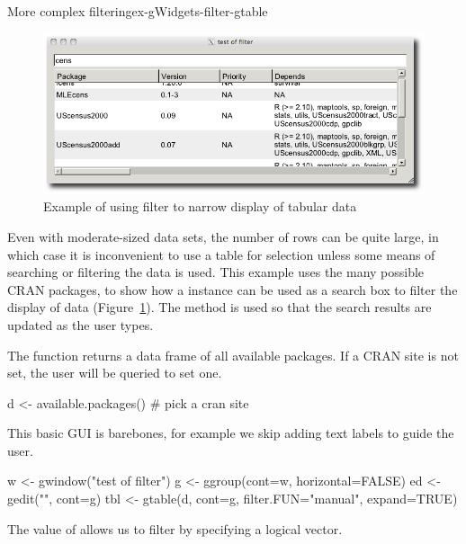 \begin{example}{More complex filtering}{ex-gWidgets-filter-gtable}

\begin{figure}
  \centering
  \includegraphics[width=.8\textwidth]{fig-gWidgets-filter-example}
  \caption{Example of using filter to narrow display of tabular data}
  \label{fig:gWidgets-filter-example}
\end{figure}

Even with moderate-sized data sets, the number of rows can be quite large, in which case it is
inconvenient to use a table for selection unless some means of searching or filtering the
data is used. This example uses the many possible CRAN packages, to show how a
 instance can be used as a search box to filter the display of
data (Figure~\ref{fig:gWidgets-filter-example}). The  method is used so that the search
results are updated as the user types.


The  function returns a data frame of all
available packages. If a CRAN site is not set, the user will be
queried to set one.
\begin{Schunk}
\begin{Sinput}
 d <- available.packages()       # pick a cran site
\end{Sinput}
\end{Schunk}

This basic GUI is barebones, for example we skip adding text labels to guide the user. 
\begin{Schunk}
\begin{Sinput}
 w <- gwindow("test of filter")
 g <- ggroup(cont=w, horizontal=FALSE)
 ed <- gedit("", cont=g)
 tbl <- gtable(d, cont=g, filter.FUN="manual", expand=TRUE)
\end{Sinput}
\end{Schunk}
The  value of  allows us to
filter by specifying a logical vector.


\end{example}

